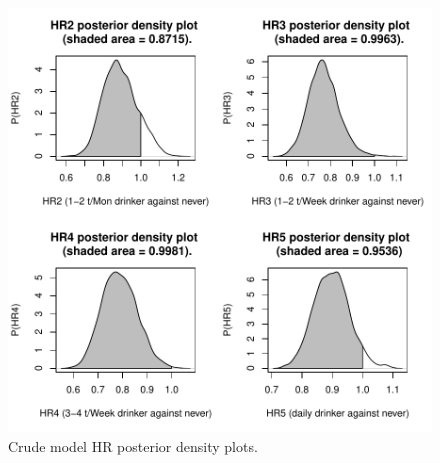 \documentclass[]{tufte-handout}
\begin{document}
\begin{figure}
\includegraphics{HandOutEngBayes_files/figure-latex/unnamed-chunk-8-1} \caption[Crude model HR posterior density plots]{Crude model HR posterior density plots.}\label{fig:unnamed-chunk-8}
\end{figure}
\end{document}
